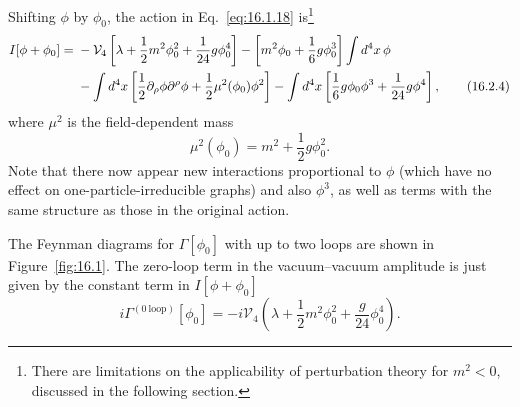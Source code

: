 Shifting $\phi$ by $\phi_0$, the action in Eq.~\eqref{eq:16.1.18} is\footnote{There are limitations on the applicability of perturbation theory for $m^2<0$, discussed in the following section.}
\begin{align}
 I[\phi+\phi_0] ={}& -\mathcal{V}_4\left[\lambda+\frac{1}{2}m^2\phi_0^2+\frac{1}{24}g\phi_0^4\right]
 -\left[m^2\phi_0+\frac{1}{6}g\phi_0^3\right]\int d^4x\,\phi \notag\\
 &-\int d^4x\left[\frac{1}{2}\partial_\rho\phi\partial^\rho\phi
 +\frac{1}{2}\mu^2(\phi_0)\phi^2\right]
 -\int d^4x\left[\frac{1}{6}g\phi_0\phi^3+\frac{1}{24}g\phi^4\right] ,
 \tag{16.2.4}
 \label{eq:16.2.4}
\end{align}
where $\mu^2$ is the field-dependent mass
\begin{equation}
 \mu^2(\phi_0) = m^2+\frac{1}{2}g\phi_0^2 .
 \tag{16.2.5}
 \label{eq:16.2.5}
\end{equation}
Note that there now appear new interactions proportional to $\phi$ (which
have no effect on one-particle-irreducible graphs) and also $\phi^3$, as well as
terms with the same structure as those in the original action.

The Feynman diagrams for $\Gamma[\phi_0]$ with up to two loops are shown in
Figure~\ref{fig:16.1}. The zero-loop term in the vacuum--vacuum amplitude is just
given by the constant term in $I[\phi+\phi_0]$
\begin{equation}
 i\Gamma^{(0\ \mathrm{loop})}[\phi_0]
 = -i\mathcal{V}_4\left(\lambda+\frac{1}{2}m^2\phi_0^2+\frac{g}{24}\phi_0^4\right) .
 \tag{16.2.6}
 \label{eq:16.2.6}
\end{equation}

